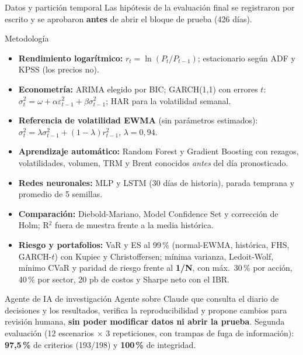 \documentclass[final]{beamer}
\newlength{\colwidth}
\begin{document}
\begin{frame}[t]
\begin{columns}[t]
\begin{column}{\colwidth}
\begin{block}{Datos y partición temporal}
    Las hipótesis de la evaluación final se registraron por escrito y se aprobaron \textbf{antes} de abrir el bloque de prueba (426 días).
  \end{block}

  \begin{alertblock}{Metodología}
    \begin{itemize}
      \item \textbf{Rendimiento logarítmico:} $r_t=\ln(P_t/P_{t-1})$; estacionario según ADF y KPSS (los precios no).
      \item \textbf{Econometría:} ARIMA elegido por BIC; GARCH(1,1) con errores $t$: $\sigma^2_t=\omega+\alpha\varepsilon^2_{t-1}+\beta\sigma^2_{t-1}$; HAR para la volatilidad semanal.
      \item \textbf{Referencia de volatilidad EWMA} (sin parámetros estimados): $\sigma^2_t=\lambda\sigma^2_{t-1}+(1-\lambda)r^2_{t-1}$, $\lambda=0{,}94$.
      \item \textbf{Aprendizaje automático:} Random Forest y Gradient Boosting con rezagos, volatilidades, volumen, TRM y Brent conocidos \textit{antes} del día pronosticado.
      \item \textbf{Redes neuronales:} MLP y LSTM (30 días de historia), parada temprana y promedio de 5 semillas.
      \item \textbf{Comparación:} Diebold-Mariano, Model Confidence Set y corrección de Holm; R$^2$ fuera de muestra frente a la media histórica.
      \item \textbf{Riesgo y portafolios:} VaR y ES al 99\,\% (normal-EWMA, histórica, FHS, GARCH-$t$) con Kupiec y Christoffersen; mínima varianza, Ledoit-Wolf, mínimo CVaR y paridad de riesgo frente al \textbf{1/N}, con máx.\ 30\,\% por acción, 40\,\% por sector, 20 pb de costos y Sharpe neto con el IBR.
    \end{itemize}
  \end{alertblock}

  \begin{block}{Agente de IA de investigación}
    Agente sobre Claude que consulta el diario de decisiones y los resultados, verifica la reproducibilidad y propone cambios para revisión humana, \textbf{sin poder modificar datos ni abrir la prueba}. Segunda evaluación (12 escenarios $\times$ 3 repeticiones, con trampas de fuga de información): \textbf{97,5\,\%} de criterios (193/198) y \textbf{100\,\%} de integridad.
  \end{block}

\end{column}


\end{columns}
\end{frame}
\end{document}
